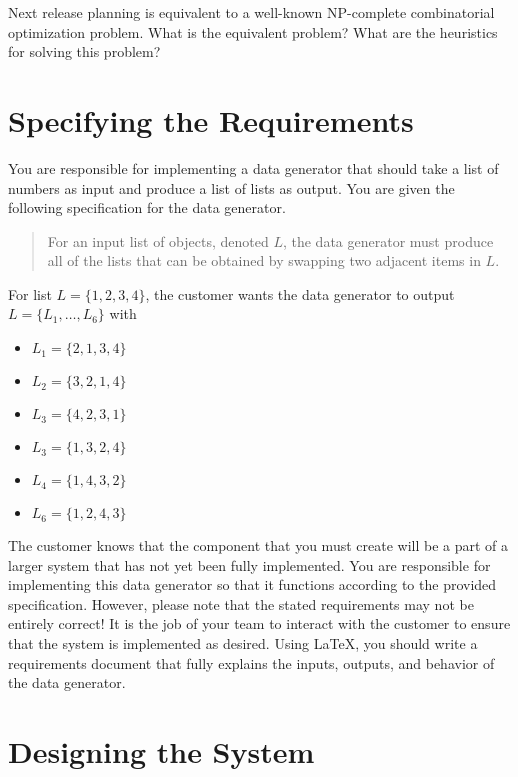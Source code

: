 Next release planning is equivalent to a well-known NP-complete combinatorial optimization problem.  What is the
equivalent problem? What are the heuristics for solving this problem?

\section*{Specifying the Requirements}

You are responsible for implementing a data generator that should take a list of numbers as input and produce a list of
lists as output.  You are given the following specification for the data generator.

\begin{quote}
For an input list of objects, denoted $L$, the data generator must produce all of the lists that can be obtained by swapping two
adjacent items in $L$.
\end{quote} 	     

\noindent
For list $L = \{1, 2, 3, 4\}$, the customer wants the data generator to output $L=\{L_1, \ldots, L_6\}$ with 

\begin{itemize}
	\item[] $L_1 = \{2, 1, 3, 4\}$
	\item[] $L_2 = \{3, 2, 1, 4\}$
	\item[] $L_3 = \{4, 2, 3, 1\}$
	\item[] $L_3 = \{1, 3, 2, 4\}$
	\item[] $L_4 = \{1, 4, 3, 2\}$
	\item[] $L_6 = \{1, 2, 4, 3\}$
\end{itemize} 

The customer knows that the component that you must create will be a part of a larger system that has not yet been
fully implemented.  You are responsible for implementing this data generator so that it functions according to the
provided specification.  However, please note that the stated requirements may not be entirely correct!  It is the job
of your team to interact with the customer to ensure that the system is implemented as desired.  Using \LaTeX, you
should write a requirements document that fully explains the inputs, outputs, and behavior of the data generator.

\section*{Designing the System}

